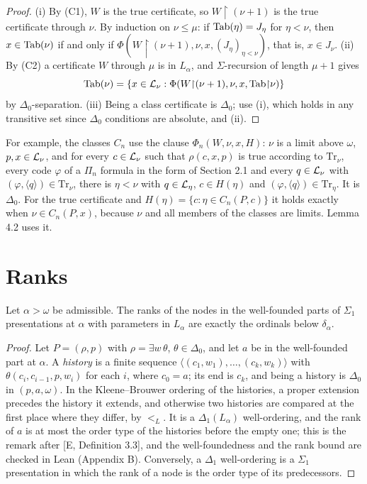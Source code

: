 \documentclass[11pt]{article}
\begin{document}
\begin{proof}
(i) By (C1), $W$ is the true certificate, so $W{\restriction}(\nu+1)$ is the true certificate through $\nu$. By
induction on $\nu \le \mu$: if $\mathrm{Tab}(\eta) = J_\eta$ for $\eta < \nu$, then $x \in \mathrm{Tab}(\nu)$ if and only if
$\Phi(W{\restriction}(\nu+1), \nu, x, (J_\eta)_{\eta<\nu})$, that is, $x \in J_\nu$. (ii) By (C2) a certificate $W$
through $\mu$ is in $L_\alpha$, and $\Sigma$-recursion of length $\mu + 1$ gives
\[ \mathrm{Tab}(\nu) = \{x \in \mathcal{L}_\nu : \Phi(W{\restriction}(\nu+1), \nu, x, \mathrm{Tab}{\restriction}\nu)\} \]
by $\Delta_0$-separation. (iii) Being a class
certificate is $\Delta_0$; use (i), which holds in any transitive set since $\Delta_0$ conditions are absolute, and (ii).
\end{proof}

For example, the classes $C_n$ use the clause $\Phi_n(W, \nu, x, H)$: $\nu$ is a limit above $\omega$, $p, x \in
\mathcal{L}_\nu$, and for every $c \in \mathcal{L}_\nu$ such that $\rho(c, x, p)$ is true according to $\mathrm{Tr}_\nu$, every code
$\varphi$ of a $\Pi_n$ formula in the form of Section 2.1 and every $q \in \mathcal{L}_\nu$ with $(\varphi, \langle q\rangle)
\in \mathrm{Tr}_\nu$, there is $\eta < \nu$ with $q \in \mathcal{L}_\eta$, $c \in H(\eta)$ and $(\varphi, \langle q\rangle) \in
\mathrm{Tr}_\eta$. It is $\Delta_0$. For the true certificate and $H(\eta) = \{c : \eta \in C_n(P,c)\}$ it holds
exactly when $\nu \in C_n(P,x)$, because $\nu$ and all members of the classes are limits. Lemma 4.2 uses it.

\section{Ranks}

\begin{statement} Let $\alpha > \omega$ be admissible. The ranks of the nodes in the well-founded
parts of $\Sigma_1$ presentations at $\alpha$ with parameters in $L_\alpha$ are exactly the ordinals below
$\delta_\alpha$.
\end{statement}

\begin{proof}
Let $P = (\rho, p)$ with $\rho = \exists w\, \theta$, $\theta \in \Delta_0$, and let $a$ be in the well-founded part
at $\alpha$. A \emph{history} is a finite sequence $\langle (c_1, w_1), \dots, (c_k, w_k)\rangle$ with $\theta(c_i,
c_{i-1}, p, w_i)$ for each $i$, where $c_0 = a$; its end is $c_k$, and being a history is $\Delta_0$ in $(p, a,
\omega)$. In the Kleene--Brouwer ordering of the histories, a proper extension precedes the history it extends, and
otherwise two histories are compared at the first place where they differ, by $<_L$. It is a $\Delta_1(L_\alpha)$
well-ordering, and the rank of $a$ is at most the order type of the histories before the empty one; this is the remark
after [E, Definition 3.3], and the well-foundedness and the rank bound are checked in Lean (Appendix B). Conversely, a
$\Delta_1$ well-ordering is a $\Sigma_1$ presentation in which the rank of a node is the order type of its
predecessors.
\end{proof}
\end{document}
